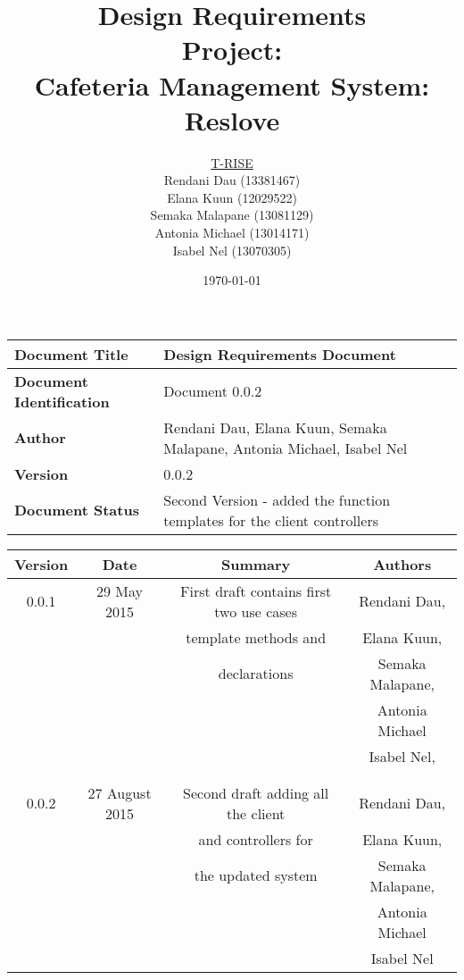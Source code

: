\documentclass[a4paper,12pt]{article}
\begin{document}
\title{\Huge Design Requirements\\ 
	 Project: \\ 
	Cafeteria Management System: Reslove}
\author{
         \underline{T-RISE}\\
          Rendani Dau (13381467) \\
	Elana Kuun (12029522) \\
	Semaka Malapane (13081129) \\
	Antonia Michael (13014171) \\
	Isabel Nel (13070305)}

\date{\today}
 

\maketitle
\break

\tableofcontents
\break

\begin{tabu} to 0.8\textwidth { | X[l] | X[l] | }
 \hline
\textbf{Document Title} & Design Requirements Document \\
 \hline
 \textbf{Document Identification}  & Document 0.0.2 \\
\hline
 \textbf{Author}  & Rendani Dau, Elana Kuun, Semaka Malapane, Antonia Michael, Isabel Nel \\
\hline
\textbf{Version} & 0.0.2 \\
\hline
\textbf{Document Status} & Second Version - added the function templates for the client controllers \\
\hline
\end{tabu}

\begin{table}[h!]
\centering
 \begin{tabular}{||c c c c||} 
 \hline
 \textbf{Version} & \textbf{Date} & \textbf{Summary} & \textbf{Authors} \\ [0.5ex] 
 \hline\hline
 0.0.1 & 29 May 2015 &  First draft contains first two use cases  & Rendani Dau, \\ & & template methods and  & Elana Kuun, \\ & &  declarations& Semaka Malapane, \\ & & & Antonia Michael \\ & & & Isabel Nel, \\ & & & \\
 \hline 
 & & & \\
 0.0.2 & 27 August 2015 &  Second draft adding all the client & Rendani Dau, \\ & & and controllers for & Elana Kuun, \\ & & the updated system & Semaka Malapane, \\ & & &  Antonia Michael \\ & & & Isabel Nel \\   [1ex] 
 \hline  
 \end{tabular}
\end{table}
\end{document}
